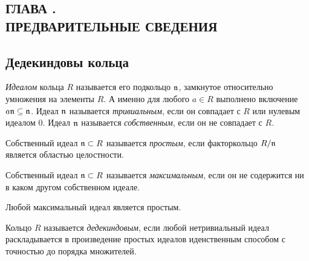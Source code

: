 \documentclass[_00_dissertation.tex]{subfiles}
\begin{document}
\onlyinsubfile{
    \renewcommand{\contentsname}{ОГЛАВЛЕНИЕ}
    \setcounter{tocdepth}{3}
    \tableofcontents
}

\newpage
\begin{center}
    \section*{ГЛАВА .\\ ПРЕДВАРИТЕЛЬНЫЕ СВЕДЕНИЯ}\label{ch:Prelimiaries}
\end{center}

\subsection{Дедекиндовы кольца}

\begin{definition}
    \emph{Идеалом} кольца $R$ называется его подкольцо $\mathfrak{n}$, замкнутое относительно умножения на элементы $R$.
    А именно для любого $a \in R$ выполнено включение $a\mathfrak{n} \subseteq \mathfrak{n}$.
    Идеал $\mathfrak{n}$ называется \emph{тривиальным}, если он совпадает с $R$ или нулевым идеалом $0$.
    Идеал $\mathfrak{n}$ называется \emph{собственным}, если он не совпадает с $R$.
\end{definition}

\begin{definition}
    Собственный идеал $\mathfrak{n} \subset R$ называется \emph{простым}, если факторкольцо $R/\mathfrak{n}$ является областью целостности.
\end{definition}

\begin{definition}
    Собственный идеал $\mathfrak{n} \subset R$ называется \emph{максимальным}, если он не содержится ни в каком другом собственном идеале.
\end{definition}

\begin{remark}
    Любой максимальный идеал является простым.
\end{remark}

\begin{definition}
    Кольцо $R$ называется \emph{дедекиндовым}, если любой нетривиальный идеал раскладывается в произведение простых идеалов иденственным способом с точностью до порядка множителей.
\end{definition}
\end{document}
